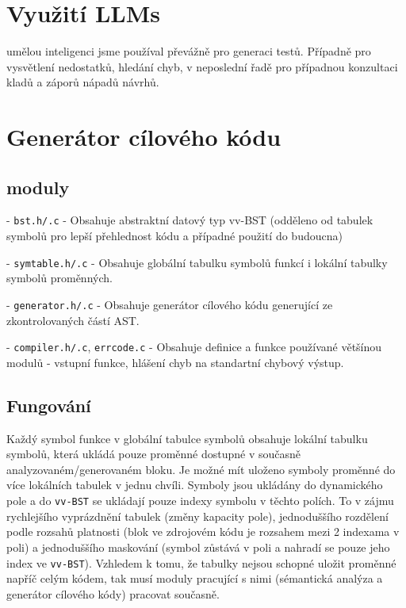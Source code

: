 \documentclass{article}
\begin{document}
\section{Využití LLMs}
umělou inteligenci jsme používal převážně pro generaci testů. Případně pro vysvětlení nedostatků, hledání chyb, v neposlední řadě pro případnou konzultaci kladů a záporů nápadů návrhů. 
\section{Generátor cílového kódu}

\subsection{moduly}

- \texttt{bst.h/.c} - Obsahuje abstraktní datový typ vv-BST (odděleno od tabulek symbolů pro lepší přehlednost kódu a případné použití do budoucna)

- \texttt{symtable.h/.c} - Obsahuje globální tabulku symbolů funkcí i lokální tabulky symbolů proměnných.

- \texttt{generator.h/.c} - Obsahuje generátor cílového kódu generující ze zkontrolovaných částí AST.

- \texttt{compiler.h/.c}, \texttt{errcode.c} - Obsahuje definice a funkce používané většínou modulů - vstupní funkce, hlášení chyb na standartní chybový výstup.


\subsection{Fungování}
Každý symbol funkce v globální tabulce symbolů obsahuje lokální tabulku symbolů, která ukládá pouze proměnné dostupné v současně analyzovaném/generovaném bloku. Je možné mít uloženo symboly proměnné do více lokálních tabulek v jednu chvíli. Symboly jsou ukládány do dynamického pole a do \texttt{vv-BST} se ukládají pouze indexy symbolu v těchto polích. To v zájmu rychlejšího vyprázdnění tabulek (změny kapacity pole), jednoduššího rozdělení podle rozsahů platnosti (blok ve zdrojovém kódu je rozsahem mezi 2 indexama v poli) a jednoduššího maskování (symbol zůstává v poli a nahradí se pouze jeho index ve \texttt{vv-BST}). Vzhledem k tomu, že tabulky nejsou schopné uložit proměnné napříč celým kódem, tak musí moduly pracující s nimi (sémantická analýza a generátor cílového kódy) pracovat současně.
\end{document}
